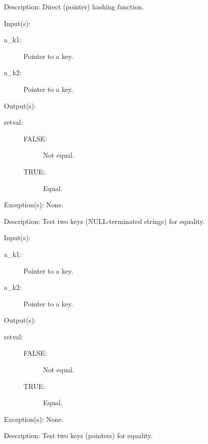 \begin{capi}
\begin{capilist}
	\item[Description: ]
		Direct (pointer) hashing function.
	\end{capilist}
\label{ch_string_key_comp}
	\begin{capilist}
	\item[Input(s): ]
		\begin{description}\item[]
		\item[a\_k1: ]
			Pointer to a key.
		\item[a\_k2: ]
			Pointer to a key.
		\end{description}
	\item[Output(s): ]
		\begin{description}\item[]
		\item[retval: ]
			\begin{description}\item[]
			\item[FALSE: ]
				Not equal.
			\item[TRUE: ]
				Equal.
			\end{description}
		\end{description}
	\item[Exception(s): ] None.
	\item[Description: ]
		Test two keys (NULL-terminated strings) for equality.
	\end{capilist}
\label{ch_direct_key_comp}
	\begin{capilist}
	\item[Input(s): ]
		\begin{description}\item[]
		\item[a\_k1: ]
			Pointer to a key.
		\item[a\_k2: ]
			Pointer to a key.
		\end{description}
	\item[Output(s): ]
		\begin{description}\item[]
		\item[retval: ]
			\begin{description}\item[]
			\item[FALSE: ]
				Not equal.
			\item[TRUE: ]
				Equal.
			\end{description}
		\end{description}
	\item[Exception(s): ] None.
	\item[Description: ]
		Test two keys (pointers) for equality.
	\end{capilist}
\end{capi}

